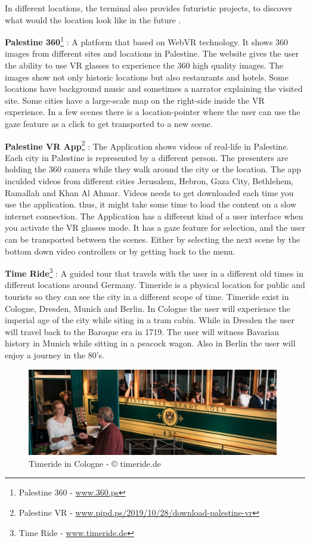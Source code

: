 In different locations, the terminal also provides futuristic projects, to discover what would the location look like in the future \citep{Hiner2016HowTechRepublic}. 

\textbf{Palestine 360}\footnote{Palestine 360 - \url{www.360.ps}} : A platform that based on WebVR technology. It shows 360 images from different sites and locations in Palestine. The website gives the user the ability to use VR glasses to experience the 360 high quality images. The  images show not only historic locations but also restaurants and hotels. Some locations have background music and sometimes a narrator explaining the visited site. Some cities have a large-scale map on the right-side inside the VR experience. In a few scenes there is a location-pointer where the user can use the gaze feature as a click to get transported to a new scene. 


\textbf{Palestine VR App}\footnote{Palestine VR - \url{www.pipd.ps/2019/10/28/download-palestine-vr}} : The Application shows videos of real-life in Palestine. Each city in Palestine is represented by a different person. The presenters are holding the 360 camera while they walk around the city or the location. The app inculded videos from different cities Jerusalem, Hebron, Gaza City, Bethlehem, Ramallah and Khan Al Ahmar. Videos needs to get downloaded each time you use the application. thus, it might take some time to load the content on a slow internet connection. The Application has a different kind of a user interface when you activate the VR glasses mode. It has a gaze feature for selection, and the user can be transported between the scenes. Either by selecting the next scene by the bottom down video controllers or by getting back to the menu. 

\textbf{Time Ride}\footnote{Time Ride - \url{www.timeride.de}} : A guided tour that travels with the user in a different old times in different locations around Germany. Timeride is a physical location for public and tourists so they can see the city in a different scope of time. Timeride exist in Cologne, Dresden, Munich and Berlin. In Cologne the user will experience the imperial age of the city while siting in a tram cabin. While in Dresden the user will travel back to the Baroque era in 1719. The user will witness Bavarian history in Munich while sitting in a peacock wagon. Also in Berlin the user will enjoy a journey in the 80's.


\begin{figure}[ht]
    \centering
    \includegraphics[width=0.98\textwidth]{images/timeride.png}
    \caption{Timeride in Cologne - © timeride.de }
    \label{fig:time}
\end{figure}

